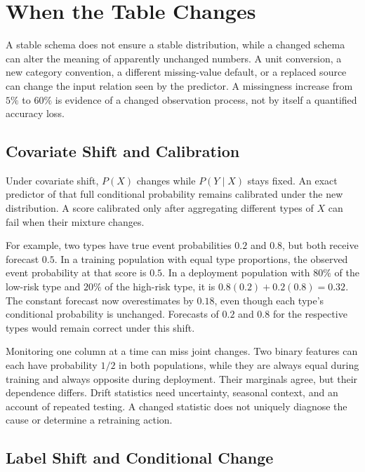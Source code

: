 \section{When the Table Changes}
\label{sec:tabular-shift}

A stable schema does not ensure a stable distribution, while a changed schema can alter the meaning of apparently unchanged numbers. A unit conversion, a new category convention, a different missing-value default, or a replaced source can change the input relation seen by the predictor. A missingness increase from $5\%$ to $60\%$ is evidence of a changed observation process, not by itself a quantified accuracy loss.

\subsection{Covariate Shift and Calibration}

Under covariate shift, $P(X)$ changes while $P(Y\mid X)$ stays fixed. An exact predictor of that full conditional probability remains calibrated under the new distribution. A score calibrated only after aggregating different types of $X$ can fail when their mixture changes.

For example, two types have true event probabilities $0.2$ and $0.8$, but both receive forecast $0.5$. In a training population with equal type proportions, the observed event probability at that score is $0.5$. In a deployment population with $80\%$ of the low-risk type and $20\%$ of the high-risk type, it is $0.8(0.2)+0.2(0.8)=0.32$. The constant forecast now overestimates by $0.18$, even though each type's conditional probability is unchanged. Forecasts of $0.2$ and $0.8$ for the respective types would remain correct under this shift.

Monitoring one column at a time can miss joint changes. Two binary features can each have probability $1/2$ in both populations, while they are always equal during training and always opposite during deployment. Their marginals agree, but their dependence differs. Drift statistics need uncertainty, seasonal context, and an account of repeated testing. A changed statistic does not uniquely diagnose the cause or determine a retraining action.

\subsection{Label Shift and Conditional Change}

